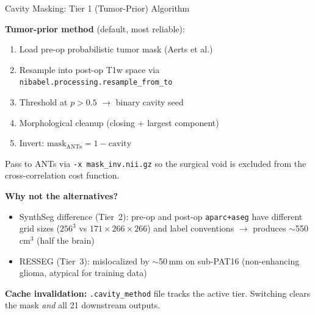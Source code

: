\begin{frame}{Cavity Masking: Tier 1 (Tumor-Prior) Algorithm}

  \textbf{Tumor-prior method} (default, most reliable):

  \begin{enumerate}
    \item Load pre-op probabilistic tumor mask (Aerts et al.)
    \item Resample into post-op T1w space via
      \texttt{nibabel.processing.resample\_from\_to}
    \item Threshold at $p > 0.5$ $\to$ binary cavity seed
    \item Morphological cleanup (closing + largest component)
    \item Invert: $\text{mask}_{\text{ANTs}} = 1 - \text{cavity}$
  \end{enumerate}

  \medskip

  Pass to ANTs via \texttt{-x mask\_inv.nii.gz} so the surgical void
  is excluded from the cross-correlation cost function.

  \medskip

  \textbf{Why not the alternatives?}
  \begin{itemize}
    \item SynthSeg difference (Tier~2): pre-op and post-op
      \texttt{aparc+aseg} have different grid sizes
      ($256^3$ vs $171\times266\times266$) and label conventions
      $\to$ produces $\sim$550\,cm$^3$ (half the brain)
    \item RESSEG (Tier~3): mislocalized by $\sim$50\,mm on
      sub-PAT16 (non-enhancing glioma, atypical for training data)
  \end{itemize}

  \medskip

  \textbf{Cache invalidation:} \texttt{.cavity\_method} file tracks
  the active tier.  Switching clears the mask \emph{and} all 21
  downstream outputs.

\end{frame}

